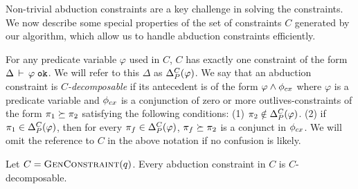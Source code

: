 Non-trivial abduction constraints are a key challenge in solving the constraints.
We now describe some special properties of the set of constraints $C$
generated by our algorithm, which allow us to handle abduction constraints efficiently.

For any predicate variable $\varphi$ used in $C$, $C$ has exactly one constraint
of the form $\Delta\,\vdash\,\varphi \; \texttt{ok}$. We will refer to this $\Delta$ as
$\Delta_P^C(\varphi)$.
%
%
We say that an abduction constraint is \emph{$C$-decomposable}
if its antecedent is of the form $\varphi \wedge \phi_{cx}$ where $\varphi$ is a predicate variable and
$\phi_{cx}$ is a conjunction of zero or more outlives-constraints of the form
$\pi_1 \succeq \pi_2$ satisfying the following conditions:
(1) $\pi_2 \notin \Delta_P^C(\varphi)$.
(2) if $\pi_1 \in \Delta_P^C(\varphi)$, then for
every $\pi_f \in \Delta_P^C(\varphi)$, $\pi_f \succeq \pi_2$ is a conjunct in $\phi_{cx}$.
%
We will omit the reference to $C$ in the above notation if no confusion is likely.

\begin{lemma}
  \label{lemma:gc-is-decomposable}
  Let $C = \textsc{GenConstraint}(q)$. Every abduction constraint in $C$ is $C$-decomposable.
\end{lemma}


